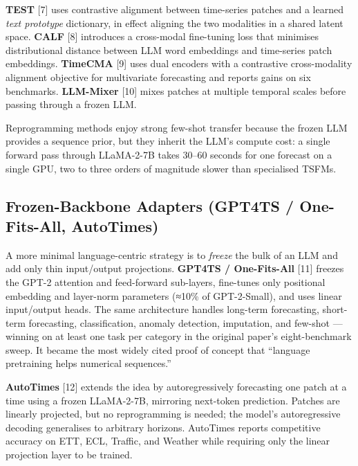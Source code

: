 \documentclass{article}
\begin{document}
\textbf{TEST} \citep{sun2024testtextprototypea} {[}7{]} uses contrastive alignment between time-series patches and a learned \emph{text prototype} dictionary, in effect aligning the two modalities in a shared latent space. \textbf{CALF} \citep{liu2025calfaligningllmsfo} {[}8{]} introduces a cross-modal fine-tuning loss that minimises distributional distance between LLM word embeddings and time-series patch embeddings. \textbf{TimeCMA} \citep{liu2025calfaligningllmsfo} {[}9{]} uses dual encoders with a contrastive cross-modality alignment objective for multivariate forecasting and reports gains on six benchmarks. \textbf{LLM-Mixer} \citep{kowsher2024llmmixermultiscale} {[}10{]} mixes patches at multiple temporal scales before passing through a frozen LLM.

Reprogramming methods enjoy strong few-shot transfer because the frozen LLM provides a sequence prior, but they inherit the LLM's compute cost: a single forward pass through LLaMA-2-7B takes 30--60 seconds for one forecast on a single GPU, two to three orders of magnitude slower than specialised TSFMs.

\subsection{Frozen-Backbone Adapters (GPT4TS / One-Fits-All, AutoTimes)}\label{frozen-backbone-adapters-gpt4ts-one-fits-all-autotimes}

A more minimal language-centric strategy is to \emph{freeze} the bulk of an LLM and add only thin input/output projections. \textbf{GPT4TS / One-Fits-All} \citep{zhou2023onefitsallpowergen} {[}11{]} freezes the GPT-2 attention and feed-forward sub-layers, fine-tunes only positional embedding and layer-norm parameters (≈10\% of GPT-2-Small), and uses linear input/output heads. The same architecture handles long-term forecasting, short-term forecasting, classification, anomaly detection, imputation, and few-shot --- winning on at least one task per category in the original paper's eight-benchmark sweep. It became the most widely cited proof of concept that ``language pretraining helps numerical sequences.''

\textbf{AutoTimes} \citep{liu2024itransformerinvert} {[}12{]} extends the idea by autoregressively forecasting one patch at a time using a frozen LLaMA-2-7B, mirroring next-token prediction. Patches are linearly projected, but no reprogramming is needed; the model's autoregressive decoding generalises to arbitrary horizons. AutoTimes reports competitive accuracy on ETT, ECL, Traffic, and Weather while requiring only the linear projection layer to be trained.
\end{document}
